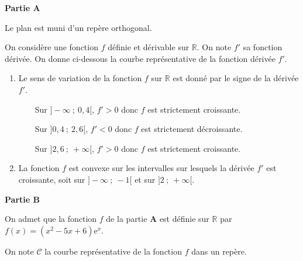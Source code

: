 
\medskip

\textbf{\large Partie A}

\medskip

Le plan est muni d'un repère orthogonal.

On considère une fonction $f$ définie et dérivable sur $\mathbb{R}$. On note $f'$ sa fonction dérivée. On donne ci-dessous la courbe représentative de la fonction dérivée $f'$.

\begin{center}
\end{center}

%

\begin{enumerate}
\item Le sens de variation de la fonction $f$ sur $\mathbb{R}$ est donné par le signe de la dérivée $f'$.%

~~\textbullet~~Sur $]-\infty~;~0,4[$, $f'>0$ donc $f$ est strictement croissante.

~~\textbullet~~Sur $]0,4~;~2,6[$, $f'<0$ donc $f$ est strictement décroissante.

~~\textbullet~~Sur $]2,6~;~+\infty[$, $f'>0$ donc $f$ est strictement croissante.

\item La fonction $f$ est convexe sur les intervalles sur lesquels la dérivée $f'$ est croissante, soit sur $]-\infty~;~-1[$ et sur $]2~;~+\infty[$.
\end{enumerate}

\medskip

\textbf{\large Partie B}

\medskip

On admet que la fonction $f$ de la partie $\mathbf{A}$ est définie sur $\mathbb{R}$ par 
$f(x)=\left(x^{2}- 5 x + 6\right) \mathrm{e}^{x}$.

On note $\mathcal{C}$ la courbe représentative de la fonction $f$ dans un repère.

